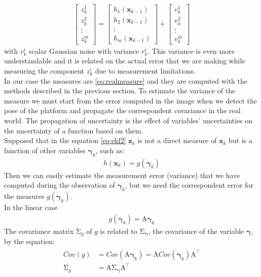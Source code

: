 \begin{align}
{\begin{bmatrix}
z_k^1 \\[10pt]
z_k^2 \\[10pt]
\vdots \\[10pt]
z_k^m
\end{bmatrix}}=
{\begin{bmatrix}
 h_1(\boldsymbol{x}_{k-1}) \\[10pt]
h_2(\boldsymbol{x}_{k-1})  \\[10pt]
\vdots \\[10pt]
h_m(\boldsymbol{x}_{k-1}) 
\end{bmatrix}} 
+ 
{\begin{bmatrix}
v_k^1 \\[10pt]
v_k^2 \\[10pt]
\vdots \\[10pt]
v_k^m
\end{bmatrix}}
\end{align}
with $v_k^i$ scalar Gaussian noise with variance $r_k^i$. This variance is even more understandable and it is related on the actual error that we are making while measuring the component $z_k^i$ due to measurement limitations.\\
In our case the measures are \ref{eq:realmeasure} and they are computed with the methods described in the previous section. To estimate the variance of the measure we must start from the error computed in the image when we detect the pose of the platform and propagate the correspondent covariance in the real world. The propagation of uncertainty is the effect of variables'  uncertainties on the uncertainty of a function based on them.\\
Supposed that in the equation \ref{eq:ekf2} $\boldsymbol{z}_k$ is not a direct measure of $\boldsymbol{x}_{k}$
but is a function of other variables $\boldsymbol{\gamma}_k$, such as:
\begin{align}
h(\boldsymbol{x}_{k}) = g(\boldsymbol{\gamma}_k)
\end{align}
Then we can easily estimate the measurement error (variance) that we have computed during the observation of  $\boldsymbol{\gamma}_k$, but we need the correspondent error for the measures $ g(\boldsymbol{\gamma}_k)$.\\

In the linear case 
\begin{align}
g(\boldsymbol{\gamma}_k) = \mathrm {A}\boldsymbol{\gamma}_k
\end{align}
The covariance matrix $\mathrm {\Sigma }_g$ of $g$ is related to $\mathrm {\Sigma }_{\boldsymbol{\gamma}}$, the covariance of the variable $\boldsymbol{\gamma}$, by the equation:
\begin{align}
\begin{split}
Cov(g) &= Cov(\mathrm {A}\boldsymbol{\gamma}_k) = \mathrm {A}Cov(\boldsymbol{\gamma}_k)\mathrm {A} ^{\top} \\ 
\mathrm {\Sigma }_g &=\mathrm {A} \mathrm {\Sigma }_{\boldsymbol{\gamma}}\mathrm {A} ^{\top}
\end{split}
\end{align}

